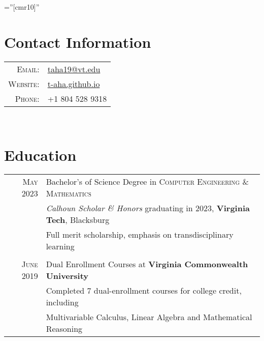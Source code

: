 \documentclass[a4paper,10.7pt]{article} %
\begin{document}
\pagestyle{empty} %
\font\fb=''[cmr10]'' %


\par{\bigskip\par} %

\section{Contact Information}

\begin{tabular}{rl}

\textsc{Email:} & \href{mailto:taha19@vt.edu}{taha19@vt.edu} \\
\textsc{Website:} & \href{t-aha.github.io}{t-aha.github.io} \\
\textsc{Phone:} & +1 804 528 9318\\

\end{tabular} \\



\section{Education}

\begin{tabular}{rl}	

\textsc{May} 2023& Bachelor's of Science Degree in \textsc{}\textsc{Computer Engineering \& Mathematics} \\
& \small\emph{Calhoun Scholar \& Honors} graduating in 2023, \normalsize\textbf{Virginia Tech}, Blacksburg\\
& Full merit scholarship, emphasis on transdisciplinary learning \\ \\


\textsc{June} 2019 & Dual Enrollment Courses at \textbf{Virginia Commonwealth University}\\
& Completed 7 dual-enrollment courses for college credit, including \\
& Multivariable Calculus, Linear Algebra and Mathematical Reasoning\\

\end{tabular} \\
\end{document}
